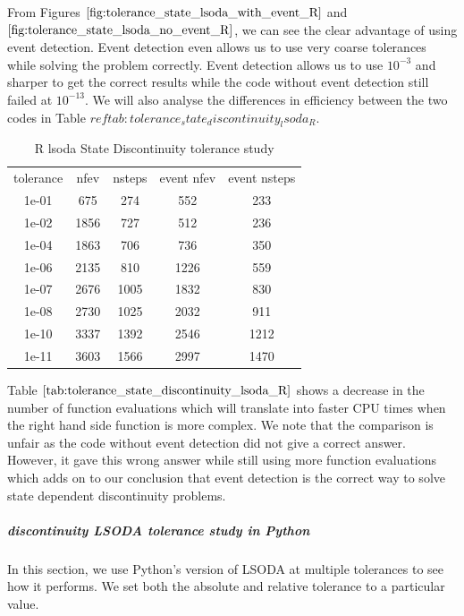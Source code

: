 From Figures $\ref{fig:tolerance_state_lsoda_with_event_R}$ and $\ref{fig:tolerance_state_lsoda_no_event_R}$, we can see the clear advantage of using event detection. Event detection even allows us to use very coarse tolerances while solving the problem correctly. Event detection allows us to use $10^{-3}$ and sharper to get the correct results while the code without event detection still failed at $10^{-13}$. We will also analyse the differences in efficiency between the two codes in Table $ref{tab:tolerance_state_discontinuity_lsoda_R}$.

\begin{table}[h]
\caption {R lsoda State Discontinuity tolerance study} \label{tab:tolerance_state_discontinuity_lsoda_R} 
\begin{center}
\begin{tabular}{ c c c c c }
tolerance & nfev & nsteps & event nfev & event nsteps \\ 
1e-01 &  675 &  274 &  552 &  233 \\
1e-02 & 1856 &  727 &  512 &  236 \\
1e-04 & 1863 &  706 &  736 &  350 \\
1e-06 & 2135 &  810 & 1226 &  559 \\
1e-07 & 2676 & 1005 & 1832 &  830 \\
1e-08 & 2730 & 1025 & 2032 &  911 \\
1e-10 & 3337 & 1392 & 2546 & 1212 \\
1e-11 & 3603 & 1566 & 2997 & 1470 \\
\end{tabular}
\end{center}
\end{table}

Table $\ref{tab:tolerance_state_discontinuity_lsoda_R}$ shows a decrease in the number of function evaluations which will translate into faster CPU times when the right hand side function is more complex. We note that the comparison is unfair as the code without event detection did not give a correct answer. However, it gave this wrong answer while still using more function evaluations which adds on to our conclusion that event detection is the correct way to solve state dependent discontinuity problems.

\subparagraph{discontinuity LSODA tolerance study in Python}
In this section, we use Python's version of LSODA at multiple tolerances to see how it performs. We set both the absolute and relative tolerance to a particular value. 

